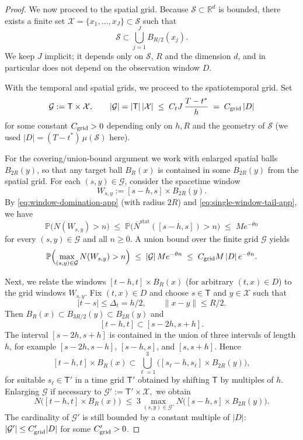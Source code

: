 \documentclass{statsoc}
\newcommand{\bbP}{\mathbb{P}}
\newcommand{\bbR}{\mathbb{R}}
\newcommand{\1}{\mathbbm{1}}
\begin{document}
\begin{proof}
We now proceed to the spatial grid. Because $\mathcal{S}\subset\bbR^d$ is bounded, there exists a
finite set $\mathcal X=\{x_1,\dots,x_J\}\subset\mathcal{S}$ such that
\[
  \mathcal{S} \subset \bigcup_{j=1}^J B_{R/2}(x_j).
\]
We keep $J$ implicit; it depends only on $\mathcal{S}$, $R$ and the dimension $d$, and in particular does not depend on the observation window $D$.

With the temporal and spatial grids, we proceed to the spatiotemporal grid. Set
\[
  \mathcal G := \mathsf{T}\times \mathcal X,\qquad
  |\mathcal G| = |\mathsf{T}|\,|\mathcal X|
  \;\le\; C_t J\,\frac{T-t^\ast}{h}
  \;=\; C_{\rm grid}\,|D|
\]
for some constant $C_{\rm grid}>0$ depending only on $h,R$ and the geometry of $\mathcal{S}$ (we used $|D|=(T-t^\ast)\,\mu(\mathcal{S})$ here).

For the covering/union-bound argument we work with enlarged spatial balls \(B_{2R}(y)\), so that any target ball \(B_R(x)\) is contained in some \(B_{2R}(y)\) from the spatial grid. For each $(s,y)\in\mathcal G$, consider the spacetime window
\[
  W_{s,y}:=[s-h,s]\times B_{2R}(y).
\]
By \eqref{eq:window-domination-app} (with radius $2R$) and \eqref{eq:single-window-tail-app}, we have
\[
  \bbP\bigl(N(W_{s,y})>n\bigr)
  \;\le\;
  \bbP\bigl(\overline N^{\mathrm{stat}}([s-h,s])>n\bigr)
  \;\le\; M e^{-\theta n}
\]
for every $(s,y)\in\mathcal G$ and all $n\ge 0$.  A union bound over the finite grid $\mathcal G$ yields
\begin{equation}\label{eq:grid-union-app}
  \bbP\Bigl(
    \max_{(s,y)\in\mathcal G} N(W_{s,y})>n
  \Bigr)
  \;\le\; |\mathcal G|\,M e^{-\theta n}
  \;\le\; C_{\rm grid} M\,|D|\,e^{-\theta n}.
\end{equation}

Next, we relate the windows $[t-h,t]\times B_R(x)$ (for arbitrary $(t,x)\in D$) to the grid windows $W_{s,y}$.  Fix $(t,x)\in D$ and choose $s\in\mathsf{T}$ and $y\in\mathcal X$ such that
\[
  |t-s|\le \Delta_t = h/2,\qquad \|x-y\|\le R/2.
\]
Then $B_R(x)\subset B_{3R/2}(y)\subset B_{2R}(y)$ and
\[
  [t-h,t]
  \subset [s-2h,s+h].
\]
The interval $[s-2h,s+h]$ is contained in the union of three intervals of length $h$, for example $[s-2h,s-h]$, $[s-h,s]$, and $[s,s+h]$.  Hence
\[
  [t-h,t]\times B_R(x)
  \subset \bigcup_{\ell=1}^3
    \bigl([s_\ell-h,s_\ell]\times B_{2R}(y)\bigr),
\]
for suitable $s_\ell\in\mathsf{T}'$ in a time grid $\mathsf{T}'$ obtained by shifting $\mathsf{T}$ by multiples of $h$.  Enlarging $\mathcal G$ if necessary to
\(
  \mathcal G':=\mathsf{T}'\times\mathcal X,
\)
we obtain
\[
  N\bigl([t-h,t]\times B_R(x)\bigr)
  \;\le\; 3\max_{(s,y)\in\mathcal G'} N\bigl([s-h,s]\times B_{2R}(y)\bigr).
\]
The cardinality of $\mathcal G'$ is still bounded by a constant multiple of $|D|$: $|\mathcal G'|\le C'_{\rm grid}|D|$ for some $C'_{\rm grid}>0$.


\end{proof}
\end{document}
